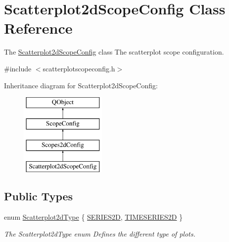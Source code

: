\hypertarget{class_scatterplot2d_scope_config}{\section{Scatterplot2d\-Scope\-Config Class Reference}
\label{class_scatterplot2d_scope_config}
}


The \hyperlink{class_scatterplot2d_scope_config}{Scatterplot2d\-Scope\-Config} class The scatterplot scope configuration.  




{\ttfamily \#include $<$scatterplotscopeconfig.\-h$>$}

Inheritance diagram for Scatterplot2d\-Scope\-Config\-:\begin{figure}[H]
\begin{center}
\leavevmode
\includegraphics[height=4.000000cm]{class_scatterplot2d_scope_config}
\end{center}
\end{figure}
\subsection*{Public Types}
\begin{DoxyCompactItemize}
\item 
enum \hyperlink{group___scope_plugin_gac3cffd2a84d02f4ebfba6df970d03e97}{Scatterplot2d\-Type} \{ \hyperlink{group___scope_plugin_ggac3cffd2a84d02f4ebfba6df970d03e97a8ac04199dbef37beba1b81fe42278b3a}{S\-E\-R\-I\-E\-S2\-D}, 
\hyperlink{group___scope_plugin_ggac3cffd2a84d02f4ebfba6df970d03e97af135d74488370bcdd47ee9744b513263}{T\-I\-M\-E\-S\-E\-R\-I\-E\-S2\-D}
 \}
\begin{DoxyCompactList}\small\item\em The Scatterplot2d\-Type enum Defines the different type of plots. \end{DoxyCompactList}\end{DoxyCompactItemize}
